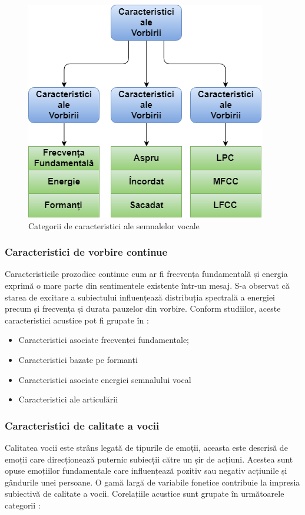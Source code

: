 \documentclass[9pt,shortpaper,twoside,web]{ieeecolor}
\begin{document}
\begin{figure}[htb]
\includegraphics[width=0.85\columnwidth]{res/fig/clasificare-caracteristicilor}
\caption{Categorii de caracteristici ale semnalelor vocale}
\label{fig2}
\end{figure}

\subsubsection{Caracteristici de vorbire continue}
Caracteristicile prozodice continue cum ar fi frecvența fundamentală și energia exprimă o mare parte din sentimentele existente într-un mesaj. S-a observat că starea de excitare a subiectului influențează distribuția spectrală a energiei precum și frecvența și durata pauzelor din vorbire. Conform studiilor, aceste caracteristici acustice pot fi grupate în \cite{b1}:

\begin{itemize}
\item Caracteristici asociate frecvenței fundamentale;

\item Caracteristici bazate pe formanți

\item Caracteristici asociate energiei semnalului vocal

\item Caracteristici ale articulării
\end{itemize}


\subsubsection{Caracteristici de calitate a vocii}
Calitatea vocii este strâns legată de tipurile de emoții, aceasta este descrisă de emoții care direcționează puternic subiecții către un șir de acțiuni. Acestea sunt opuse emoțiilor fundamentale care influențează pozitiv sau negativ acțiunile și gândurile unei persoane. O gamă largă de variabile fonetice contribuie la impresia subiectivă de calitate a vocii. Corelațiile acustice sunt grupate în următoarele categorii \cite{b1}:
\end{document}

